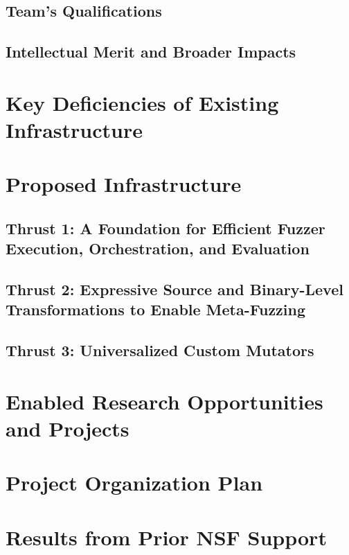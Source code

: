 \documentclass[numbers]{proposalnsf}
\begin{document}
\subsection{Team's Qualifications}

\subsection{Intellectual Merit and Broader Impacts}

\section{Key Deficiencies of Existing Infrastructure}

\section{Proposed Infrastructure}

\subsection{Thrust 1: A Foundation for Efficient Fuzzer Execution, Orchestration, and Evaluation}

\subsection{Thrust 2: Expressive Source and Binary-Level Transformations to Enable Meta-Fuzzing}

\subsection{Thrust 3: Universalized Custom Mutators}

\section{Enabled Research Opportunities and Projects}

\section{Project Organization Plan}


\section{Results from Prior NSF Support}




\newpage
%


\end{document}

